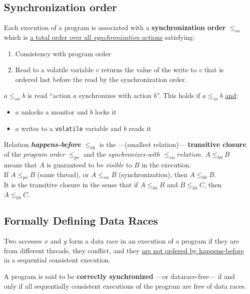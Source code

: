 \subsection{Synchronization order}
{Each execution of a program is associated with a \textbf{synchronization order} $\leq_{so}$ which is \ul{a total order over all \textit{synchronization} actions} satisfying:\ns
\begin{enumerate}
   \item Consistency with program order
   \item Read to a volatile variable $v$ returns the value of the write to $v$ that is ordered last before the read by the synchronization order.
\end{enumerate}}

{$a \leq_{sw} b$ is read ``action $a$ synchronizes with action $b$''. This holds if $a \leq_{so} b$ \ul{and}:\ns
\begin{itemize}
   \item $a$ unlocks a monitor and $b$ locks it
   \item $a$ writes to a \lstinline|volatile| variable and $b$ reads it
\end{itemize}
}

Relation \textit{\textbf{happens-before}} $\leq_{hb}$ is the ---(smallest relation)--- \textbf{transitive closure} of the \textit{program order} $\leq_{po}$ and the \textit{synchronizes-with} $\leq_{sw} relation.$
$A \leq_{hb} B$ means that $A$ is guaranteed to be \textit{visible} to $B$ in the execution.\\
If $A \leq_{po} B$ (same thread), or $A \leq_{sw} B$ (synchronization), then $A \leq_{hb} B$.\\
It is the transitive closure in the sense that if $A \leq_{hb} B$ and $B \leq_{hb} C$, then $A \leq_{hb} C$.

\subsection{Formally Defining Data Races}
\begin{definition}
   Two accesses $x$ and $y$ form a data race in an execution of a program if they are from different threads, they conflict, and they \ul{are not ordered by happens-before} in a sequential consistent execution.
\end{definition}

A program is said to be \textbf{correctly synchronized} ---or datarace-free--- if and only if all sequentially consistent executions of the program are free of data races.

